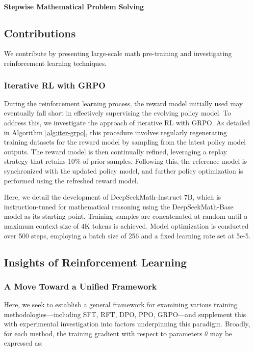 \begin{itemize}[topsep=0pt]
\paragraph{Stepwise Mathematical Problem Solving}

\subsection{Contributions}
We contribute by presenting large-scale math pre-training and investigating reinforcement learning techniques.

\subsubsection{Iterative RL with GRPO} During the reinforcement learning process, the reward model initially used may eventually fall short in effectively supervising the evolving policy model. To address this, we investigate the approach of iterative RL with GRPO. As detailed in Algorithm \ref{alg:iter-grpo}, this procedure involves regularly regenerating training datasets for the reward model by sampling from the latest policy model outputs. The reward model is then continually refined, leveraging a replay strategy that retains 10\% of prior samples. Following this, the reference model is synchronized with the updated policy model, and further policy optimization is performed using the refreshed reward model.

Here, we detail the development of DeepSeekMath-Instruct 7B, which is instruction-tuned for mathematical reasoning using the DeepSeekMath-Base model as its starting point. Training samples are concatenated at random until a maximum context size of 4K tokens is achieved. Model optimization is conducted over 500 steps, employing a batch size of 256 and a fixed learning rate set at 5e-5.

\subsection{Insights of Reinforcement Learning}
\subsubsection{A Move Toward a Unified Framework} Here, we seek to establish a general framework for examining various training methodologies—including SFT, RFT, DPO, PPO, GRPO—and supplement this with experimental investigation into factors underpinning this paradigm. Broadly, for each method, the training gradient with respect to parameters $\theta$ may be expressed as:



\end{itemize}
